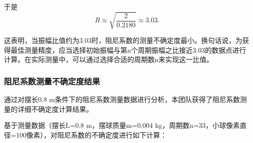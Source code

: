     于是
    \begin{equation}
        R \approx \sqrt{\frac{2}{0.2180}} \approx 3.03.
    \end{equation}
    
    这表明，当振幅比值约为3.03时，阻尼系数的测量不确定度最小。换句话说，为获得最佳测量精度，应当选择初始振幅与第n个周期振幅之比接近3.03的数据点进行计算。在实际测量中，可以通过选择合适的周期数n来实现这一比值。
    
\subsubsection{阻尼系数测量不确定度结果}

通过对摆长0.8 m条件下的阻尼系数测量数据进行分析，本团队获得了阻尼系数测量的详细不确定度计算结果。

基于测量数据（摆长L=0.8 m，摆球质量m=0.004 kg，周期数n=33，小球像素直径=100像素），对阻尼系数的不确定度进行如下计算：

